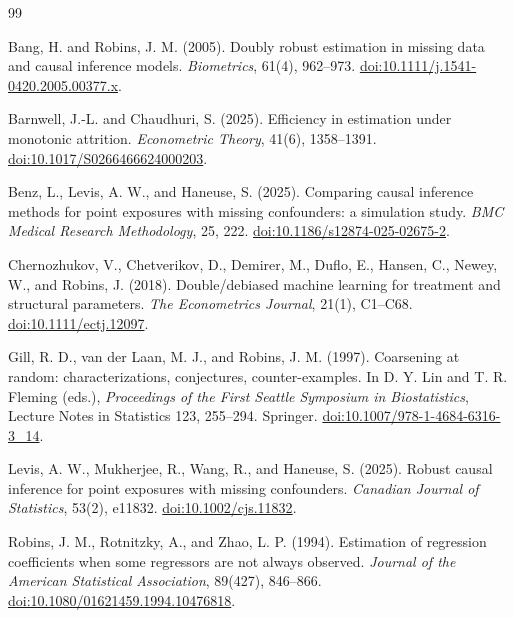\documentclass[11pt]{article}
\theoremstyle{definition}
\newcommand{\1}{\mathbf{1}}
\begin{document}
\begin{thebibliography}{99}

Bang, H. and Robins, J. M. (2005).
Doubly robust estimation in missing data and causal inference models.
\emph{Biometrics}, 61(4), 962--973.
\href{https://doi.org/10.1111/j.1541-0420.2005.00377.x}{doi:10.1111/j.1541-0420.2005.00377.x}.

Barnwell, J.-L. and Chaudhuri, S. (2025).
Efficiency in estimation under monotonic attrition.
\emph{Econometric Theory}, 41(6), 1358--1391.
\href{https://doi.org/10.1017/S0266466624000203}{doi:10.1017/S0266466624000203}.

Benz, L., Levis, A. W., and Haneuse, S. (2025).
Comparing causal inference methods for point exposures with missing confounders: a simulation study.
\emph{BMC Medical Research Methodology}, 25, 222.
\href{https://doi.org/10.1186/s12874-025-02675-2}{doi:10.1186/s12874-025-02675-2}.

Chernozhukov, V., Chetverikov, D., Demirer, M., Duflo, E., Hansen, C., Newey, W., and Robins, J. (2018).
Double/debiased machine learning for treatment and structural parameters.
\emph{The Econometrics Journal}, 21(1), C1--C68.
\href{https://doi.org/10.1111/ectj.12097}{doi:10.1111/ectj.12097}.

Gill, R. D., van der Laan, M. J., and Robins, J. M. (1997).
Coarsening at random: characterizations, conjectures, counter-examples.
In D. Y. Lin and T. R. Fleming (eds.), \emph{Proceedings of the First Seattle Symposium in Biostatistics}, Lecture Notes in Statistics 123, 255--294. Springer.
\href{https://doi.org/10.1007/978-1-4684-6316-3_14}{doi:10.1007/978-1-4684-6316-3\_14}.

Levis, A. W., Mukherjee, R., Wang, R., and Haneuse, S. (2025).
Robust causal inference for point exposures with missing confounders.
\emph{Canadian Journal of Statistics}, 53(2), e11832.
\href{https://doi.org/10.1002/cjs.11832}{doi:10.1002/cjs.11832}.

Robins, J. M., Rotnitzky, A., and Zhao, L. P. (1994).
Estimation of regression coefficients when some regressors are not always observed.
\emph{Journal of the American Statistical Association}, 89(427), 846--866.
\href{https://doi.org/10.1080/01621459.1994.10476818}{doi:10.1080/01621459.1994.10476818}.


\end{thebibliography}
\end{document}
